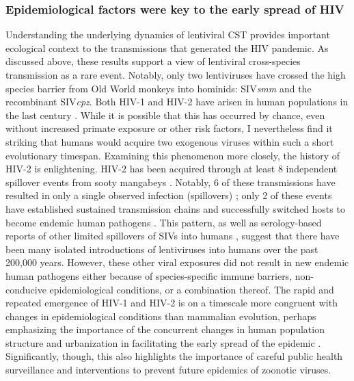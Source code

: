 \subsubsection*{Epidemiological factors were key to the early spread of HIV}
Understanding the underlying dynamics of lentiviral CST provides important ecological context to the transmissions that generated the HIV pandemic.
As discussed above, these results support a view of lentiviral cross-species transmission as a rare event.
Notably, only two lentiviruses have crossed the high species barrier from Old World monkeys into hominids: SIV\textit{smm} and the recombinant SIV\textit{cpz}.
Both HIV-1 and HIV-2 have arisen in human populations in the last century \citep{faria2014early,sharp2011origins}.
While it is possible that this has occurred by chance, even without increased primate exposure or other risk factors, I nevertheless find it striking that humans would acquire two exogenous viruses within such a short evolutionary timespan.
Examining this phenomenon more closely, the history of HIV-2 is enlightening.
HIV-2 has been acquired through at least 8 independent spillover events from sooty mangabeys \citep{sharp2011origins}.
Notably, 6 of these transmissions have resulted in only a single observed infection (spillovers) \citep{chen1996genetic,chen1997human,gao1992human}; only 2 of these events have established sustained transmission chains and successfully switched hosts to become endemic human pathogens \citep{damond2001quantification,ishikawa2001genetic,pieniazek1999predominance}.
This pattern, as well as serology-based reports of other limited spillovers of SIVs into humans \citep{kalish2005central,souquiere2001wild}, suggest that there have been many isolated introductions of lentiviruses into humans over the past 200,000 years.
However, these other viral exposures did not result in new endemic human pathogens either because of species-specific immune barriers, non-conducive epidemiological conditions, or a combination thereof.
The rapid and repeated emergence of HIV-1 and HIV-2 is on a timescale more congruent with changes in epidemiological conditions than mammalian evolution, perhaps emphasizing the importance of the concurrent changes in human population structure and urbanization in facilitating the early spread of the epidemic \citep{faria2014early}.
Significantly, though, this also highlights the importance of careful public health surveillance and interventions to prevent future epidemics of zoonotic viruses.

